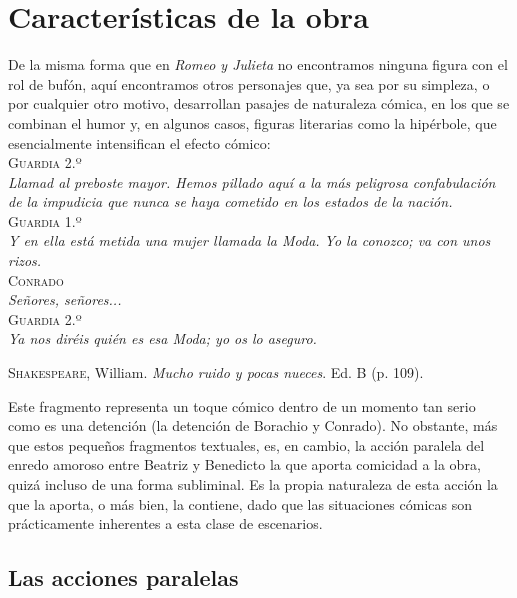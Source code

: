 \documentclass[12pt,a4paper]{article}
\begin{document}
\section{Características de la obra}

De la misma forma que en \textit{Romeo y Julieta} no encontramos ninguna figura con el rol de bufón, aquí encontramos otros personajes que, ya sea por su simpleza, o por cualquier otro motivo, desarrollan pasajes de naturaleza cómica, en los que se combinan el humor y, en algunos casos, figuras literarias como la hipérbole, que esencialmente intensifican el efecto cómico:\\

\noindent\textsc{Guardia 2.º}\\
\indent\textit{Llamad al preboste mayor. Hemos pillado aquí a la más peligrosa confabulación de la impudicia que nunca se haya cometido en los estados de la nación.}\\
\noindent\textsc{Guardia 1.º}\\
\indent\textit{Y en ella está metida una mujer llamada la Moda. Yo la conozco; va con unos rizos.}\\
\noindent\textsc{Conrado}\\
\indent\textit{Señores, señores...}\\
\noindent\textsc{Guardia 2.º}\\
\indent\textit{Ya nos diréis quién es esa Moda; yo os lo aseguro.}\\
\begin{flushright}
	\textsc{Shakespeare}, William. \textit{Mucho ruido y pocas nueces}. Ed. B (p. 109).\\
\end{flushright}

Este fragmento representa un toque cómico dentro de un momento tan serio como es una detención (la detención de Borachio y Conrado). No obstante, más que estos pequeños fragmentos textuales, es, en cambio, la acción paralela del enredo amoroso entre Beatriz y Benedicto la que aporta comicidad a la obra, quizá incluso de una forma subliminal. Es la propia naturaleza de esta acción la que la aporta, o más bien, la contiene, dado que las situaciones cómicas son prácticamente inherentes a esta clase de escenarios.\\

\subsection{Las acciones paralelas}
\end{document}
